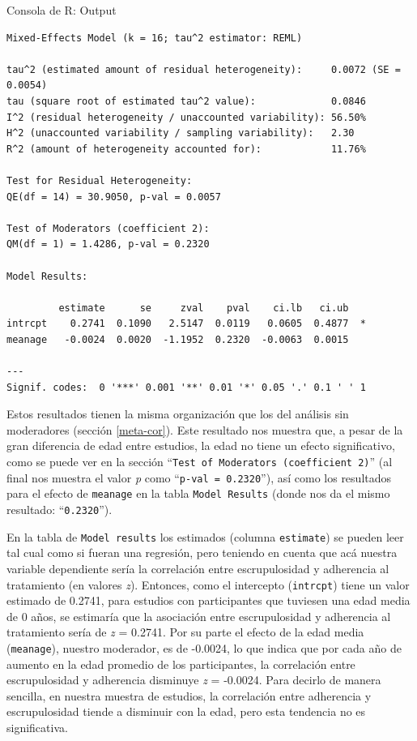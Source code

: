 \documentclass[
  bookmarksnumbered]{article}
\begin{document}
\begin{ROut}{Consola de R: Output~\thetcbcounter}
                \begin{footnotesize}
                \begin{verbatim} 
Mixed-Effects Model (k = 16; tau^2 estimator: REML)

tau^2 (estimated amount of residual heterogeneity):     0.0072 (SE = 0.0054)
tau (square root of estimated tau^2 value):             0.0846
I^2 (residual heterogeneity / unaccounted variability): 56.50%
H^2 (unaccounted variability / sampling variability):   2.30
R^2 (amount of heterogeneity accounted for):            11.76%

Test for Residual Heterogeneity:
QE(df = 14) = 30.9050, p-val = 0.0057

Test of Moderators (coefficient 2):
QM(df = 1) = 1.4286, p-val = 0.2320

Model Results:

         estimate      se     zval    pval    ci.lb   ci.ub    
intrcpt    0.2741  0.1090   2.5147  0.0119   0.0605  0.4877  * 
meanage   -0.0024  0.0020  -1.1952  0.2320  -0.0063  0.0015    

---
Signif. codes:  0 '***' 0.001 '**' 0.01 '*' 0.05 '.' 0.1 ' ' 1
 \end{verbatim}
                \end{footnotesize}
                \end{ROut}

Estos resultados tienen la misma organización que los del análisis sin moderadores (sección \ref{meta-cor}). Este resultado nos muestra que, a pesar de la gran diferencia de edad entre estudios, la edad no tiene un efecto significativo, como se puede ver en la sección ``\texttt{Test\ of\ Moderators\ (coefficient\ 2)}'' (al final nos muestra el valor \emph{p} como ``\texttt{p-val =  0.2320}''), así como los resultados para el efecto de \texttt{meanage} en la tabla \texttt{Model\ Results} (donde nos da el mismo resultado: ``\texttt{0.2320}'').

En la tabla de \texttt{Model\ results} los estimados (columna \texttt{estimate}) se pueden leer tal cual como si fueran una regresión, pero teniendo en cuenta que acá nuestra variable dependiente sería la correlación entre escrupulosidad y adherencia al tratamiento (en valores \emph{z}). Entonces, como el intercepto (\texttt{intrcpt}) tiene un valor estimado de 0.2741, para estudios con participantes que tuviesen una edad media de 0 años, se estimaría que la asociación entre escrupulosidad y adherencia al tratamiento sería de \emph{z} = 0.2741. Por su parte el efecto de la edad media (\texttt{meanage}), nuestro moderador, es de -0.0024, lo que indica que por cada año de aumento en la edad promedio de los participantes, la correlación entre escrupulosidad y adherencia disminuye \emph{z} = -0.0024. Para decirlo de manera sencilla, en nuestra muestra de estudios, la correlación entre adherencia y escrupulosidad tiende a disminuir con la edad, pero esta tendencia no es significativa.
\end{document}

